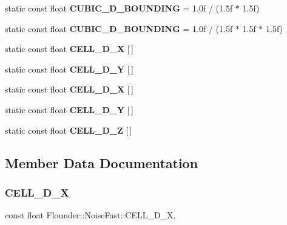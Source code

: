 \begin{DoxyCompactItemize}
\item 
\mbox{\label{class_flounder_1_1_noise_fast_abe1dabbb137dbbe45793458f03f76107}} 
static const float {\bfseries C\+U\+B\+I\+C\+\_\+D\+\_\+\+B\+O\+U\+N\+D\+I\+NG} = 1.\+0f / (1.\+5f $\ast$ 1.\+5f)
\item 
\mbox{\label{class_flounder_1_1_noise_fast_a13e98694bcf58d264ce4c915e42ce45e}} 
static const float {\bfseries C\+U\+B\+I\+C\+\_\+D\+\_\+\+B\+O\+U\+N\+D\+I\+NG} = 1.\+0f / (1.\+5f $\ast$ 1.\+5f $\ast$ 1.\+5f)
\item 
static const float {\bfseries C\+E\+L\+L\+\_\+D\+\_\+X} \mbox{[}$\,$\mbox{]}
\item 
static const float {\bfseries C\+E\+L\+L\+\_\+D\+\_\+Y} \mbox{[}$\,$\mbox{]}
\item 
static const float {\bfseries C\+E\+L\+L\+\_\+D\+\_\+X} \mbox{[}$\,$\mbox{]}
\item 
static const float {\bfseries C\+E\+L\+L\+\_\+D\+\_\+Y} \mbox{[}$\,$\mbox{]}
\item 
static const float {\bfseries C\+E\+L\+L\+\_\+D\+\_\+Z} \mbox{[}$\,$\mbox{]}
\end{DoxyCompactItemize}


\subsection{Member Data Documentation}
\mbox{\label{class_flounder_1_1_noise_fast_acc51906e653f4b5aa58c9d95f3afb1c8}} 
\subsubsection{\texorpdfstring{C\+E\+L\+L\+\_\+D\+\_\+X}{CELL\_2D\_X}}
{\footnotesize\ttfamily const float Flounder\+::\+Noise\+Fast\+::\+C\+E\+L\+L\+\_\+D\+\_\+X\hspace{0.3cm}{\ttfamily [static]}, {\ttfamily [private]}}

